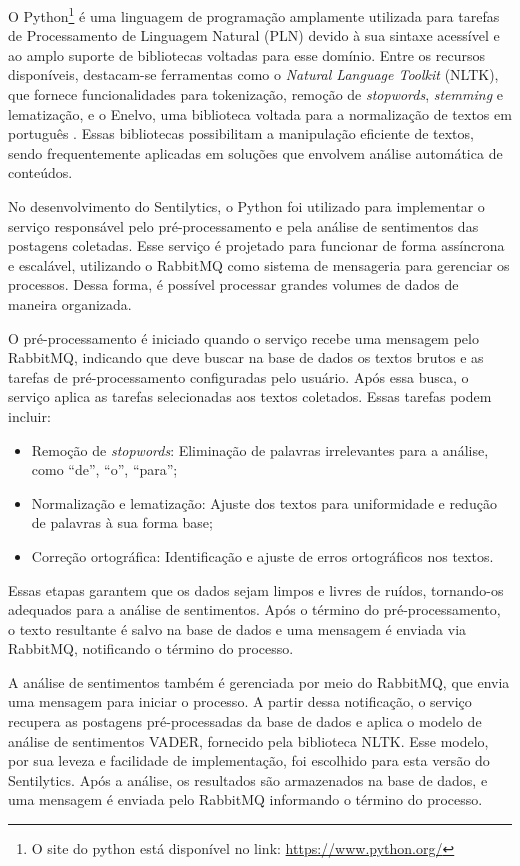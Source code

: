 \documentclass[
	12pt,				%
	oneside,			%
	a4paper,			%
	english,			%
	french,				%
	spanish,			%
	brazil				%
	]{abntex2}
\begin{document}
O Python\footnote{O site do python está disponível no link:
  \url{https://www.python.org/}} é uma linguagem de programação
amplamente utilizada para tarefas de Processamento de Linguagem Natural
(PLN) devido à sua sintaxe acessível e ao amplo suporte de bibliotecas
voltadas para esse domínio. Entre os recursos disponíveis, destacam-se
ferramentas como o \emph{Natural Language Toolkit} (NLTK), que fornece
funcionalidades para tokenização, remoção de \emph{stopwords},
\emph{stemming} e lematização, e o Enelvo, uma biblioteca voltada para a
normalização de textos em português \cite{bertaglia2016exploring}. Essas
bibliotecas possibilitam a manipulação eficiente de textos, sendo
frequentemente aplicadas em soluções que envolvem análise automática de
conteúdos.

No desenvolvimento do Sentilytics, o Python foi utilizado para
implementar o serviço responsável pelo pré-processamento e pela análise
de sentimentos das postagens coletadas. Esse serviço é projetado para
funcionar de forma assíncrona e escalável, utilizando o RabbitMQ como
sistema de mensageria para gerenciar os processos. Dessa forma, é
possível processar grandes volumes de dados de maneira organizada.

O pré-processamento é iniciado quando o serviço recebe uma mensagem pelo
RabbitMQ, indicando que deve buscar na base de dados os textos brutos e
as tarefas de pré-processamento configuradas pelo usuário. Após essa
busca, o serviço aplica as tarefas selecionadas aos textos coletados.
Essas tarefas podem incluir:

\begin{itemize}
\tightlist
\item
  Remoção de \emph{stopwords}: Eliminação de palavras irrelevantes para
  a análise, como ``de'', ``o'', ``para'';
\item
  Normalização e lematização: Ajuste dos textos para uniformidade e
  redução de palavras à sua forma base;
\item
  Correção ortográfica: Identificação e ajuste de erros ortográficos nos
  textos.
\end{itemize}

Essas etapas garantem que os dados sejam limpos e livres de ruídos,
tornando-os adequados para a análise de sentimentos. Após o término do
pré-processamento, o texto resultante é salvo na base de dados e uma
mensagem é enviada via RabbitMQ, notificando o término do processo.

A análise de sentimentos também é gerenciada por meio do RabbitMQ, que
envia uma mensagem para iniciar o processo. A partir dessa notificação,
o serviço recupera as postagens pré-processadas da base de dados e
aplica o modelo de análise de sentimentos VADER, fornecido pela
biblioteca NLTK. Esse modelo, por sua leveza e facilidade de
implementação, foi escolhido para esta versão do Sentilytics. Após a
análise, os resultados são armazenados na base de dados, e uma mensagem
é enviada pelo RabbitMQ informando o término do processo.
\end{document}
